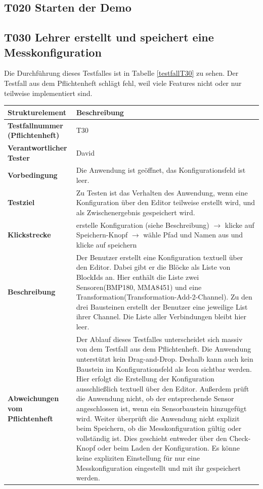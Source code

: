 \documentclass[parskip=full]{scrartcl}
\begin{document}
\subsection{\textbf{T020} Starten der Demo}



\subsection{\textbf{T030} Lehrer erstellt und speichert eine Messkonfiguration}
Die Durchführung dieses Testfalles ist in Tabelle \ref{testfallT30} zu sehen. Der Testfall aus dem Pflichtenheft schlägt fehl, weil viele Features nicht oder nur teilweise implementiert sind.


\begin{table}[h]
\begin{tabular}{| p{4cm} | p{10cm} |}
	\hline
	\textbf{Strukturelement} & \textbf{Beschreibung} \\ \hline
	\textbf{Testfallnummer (Pflichtenheft)}
	& 
	T30
	\\ \hline
	\textbf{Verantwortlicher Tester}
	& 
	David
	\\ \hline
	\textbf{Vorbedingung}
	& 
	Die Anwendung ist geöffnet, das Konfigurationsfeld ist leer.
	\\ \hline
	\textbf{ Testziel}
	& 
	Zu Testen ist das Verhalten des Anwendung, wenn eine Konfiguration über den Editor teilweise erstellt wird, und als Zwischenergebnis gespeichert wird.
	\\ \hline
	
	\textbf{Klickstrecke}
	& 
	erstelle Konfiguration (siehe Beschreibung) $\rightarrow$ klicke auf Speichern-Knopf $\rightarrow$ wähle Pfad und Namen aus und klicke auf speichern
	\\ \hline
	
	\textbf{ Beschreibung}
	& 
	Der Benutzer erstellt eine Konfiguration textuell über den Editor. Dabei gibt er die Blöcke als Liste von BlockIds an. Hier enthält die Liste zwei Sensoren(BMP180, MMA8451) und eine Transformation(Transformation-Add-2-Channel). Zu den drei Bausteinen erstellt der Benutzer eine jeweilige List ihrer Channel. Die Liste aller Verbindungen bleibt hier leer.
	\\ \hline
	
	\textbf{Abweichungen vom Pflichtenheft}
	& 
	Der Ablauf dieses Testfalles unterscheidet sich massiv von dem Testfall aus dem Pflichtenheft. Die Anwendung unterstützt kein Drag-and-Drop. Deshalb kann auch kein Baustein im Konfigurationsfeld als Icon sichtbar werden. Hier erfolgt die Erstellung der Konfiguration ausschließlich textuell über den Editor. Außerdem prüft die Anwendung nicht, ob der entsprechende Sensor angeschlossen ist, wenn ein Sensorbaustein hinzugefügt wird. Weiter überprüft die Anwendung nicht explizit beim Speichern, ob die Messkonfiguration gültig oder vollständig ist. Dies geschieht entweder über den Check-Knopf oder beim Laden der Konfiguration. Es könne keine expliziten Einstellung für nur eine Messkonfiguration eingestellt und mit ihr gespeichert werden. 


\end{tabular}
\end{table}
\end{document}
